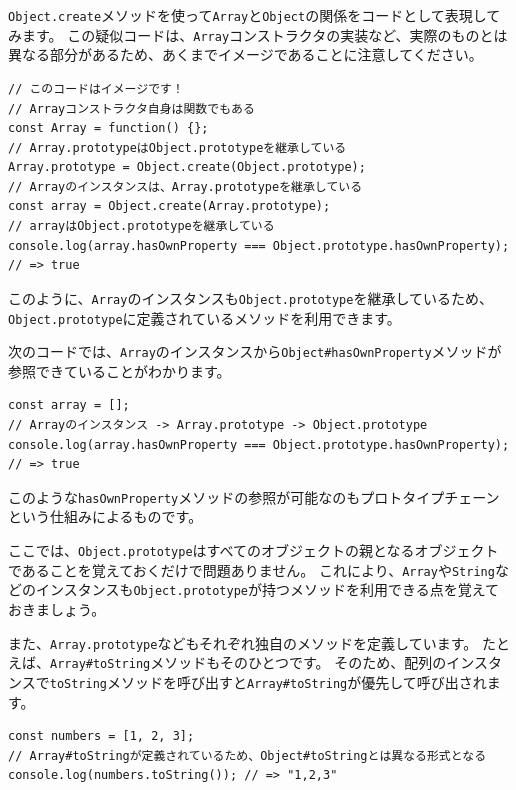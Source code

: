 \texttt{Object.create}メソッドを使って\texttt{Array}と\texttt{Object}の関係をコードとして表現してみます。
この疑似コードは、\texttt{Array}コンストラクタの実装など、実際のものとは異なる部分があるため、あくまでイメージであることに注意してください。

\begin{lstlisting}
// このコードはイメージです！
// Arrayコンストラクタ自身は関数でもある
const Array = function() {};
// Array.prototypeはObject.prototypeを継承している
Array.prototype = Object.create(Object.prototype);
// Arrayのインスタンスは、Array.prototypeを継承している
const array = Object.create(Array.prototype);
// arrayはObject.prototypeを継承している
console.log(array.hasOwnProperty === Object.prototype.hasOwnProperty); 
// => true
\end{lstlisting}

このように、\texttt{Array}のインスタンスも\texttt{Object.prototype}を継承しているため、
\texttt{Object.prototype}に定義されているメソッドを利用できます。

次のコードでは、\texttt{Array}のインスタンスから\texttt{Object\#hasOwnProperty}メソッドが参照できていることがわかります。

\begin{lstlisting}
const array = [];
// Arrayのインスタンス -> Array.prototype -> Object.prototype
console.log(array.hasOwnProperty === Object.prototype.hasOwnProperty); 
// => true
\end{lstlisting}

このような\texttt{hasOwnProperty}メソッドの参照が可能なのもプロトタイプチェーンという仕組みによるものです。

ここでは、\texttt{Object.prototype}はすべてのオブジェクトの親となるオブジェクトであることを覚えておくだけで問題ありません。
これにより、\texttt{Array}や\texttt{String}などのインスタンスも\texttt{Object.prototype}が持つメソッドを利用できる点を覚えておきましょう。

また、\texttt{Array.prototype}などもそれぞれ独自のメソッドを定義しています。
たとえば、\texttt{Array\#toString}メソッドもそのひとつです。
そのため、配列のインスタンスで\texttt{toString}メソッドを呼び出すと\texttt{Array\#toString}が優先して呼び出されます。

\begin{lstlisting}
const numbers = [1, 2, 3];
// Array#toStringが定義されているため、Object#toStringとは異なる形式となる
console.log(numbers.toString()); // => "1,2,3"
\end{lstlisting}

